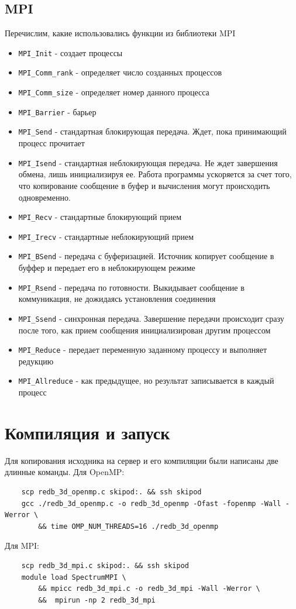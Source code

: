 \documentclass[./import.tex]{subfiles}
\begin{document}
\subsection{MPI}
Перечислим, какие использовались функции из библиотеки MPI
\begin{itemize}
    \item \verb|MPI_Init|  - создает процессы
    \item \verb|MPI_Comm_rank| - определяет число созданных процессов
    \item \verb|MPI_Comm_size| - определяет номер данного процесса
    \item \verb|MPI_Barrier| - барьер
    \item \verb|MPI_Send| - стандартная блокирующая передача. Ждет, пока принимающий процесс прочитает
    \item \verb|MPI_Isend| - стандартная неблокирующая передача. Не ждет завершения обмена, лишь инициализируя ее. Работа программы ускоряется за счет того, что копирование сообщение в буфер и вычисления могут происходить одновременно.
    \item \verb|MPI_Recv| - стандартные блокирующий прием
    \item \verb|MPI_Irecv| - стандартные неблокирующий прием
    \item \verb|MPI_BSend| - передача с буферизацией. Источник копирует сообщение в буффер и передает его в неблокирующем режиме
    \item \verb|MPI_Rsend| - передача по готовности. Выкидывает сообщение в коммуникация, не дожидаясь установления соединения
    \item \verb|MPI_Ssend| - синхронная передача. Завершение передачи происходит сразу после того, как прием сообщения инициализирован другим процессом
    \item \verb|MPI_Reduce| - передает переменную заданному процессу и выполняет редукцию
    \item \verb|MPI_Allreduce| - как предыдущее, но результат записывается в каждый процесс
\end{itemize}

\section{Компиляция и запуск}
Для копирования исходника на сервер и его компиляции были написаны две длинные команды. Для OpenMP:
\begin{verbatim}
    scp redb_3d_openmp.c skipod:. && ssh skipod
    gcc ./redb_3d_openmp.c -o redb_3d_openmp -Ofast -fopenmp -Wall -Werror \
        && time OMP_NUM_THREADS=16 ./redb_3d_openmp
\end{verbatim}
Для MPI:
\begin{verbatim}
    scp redb_3d_mpi.c skipod:. && ssh skipod
    module load SpectrumMPI \
        && mpicc redb_3d_mpi.c -o redb_3d_mpi -Wall -Werror \
        &&  mpirun -np 2 redb_3d_mpi
\end{verbatim}
\end{document}
